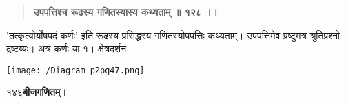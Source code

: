 \documentclass[11pt, openany]{book}
\begin{document}
\begin{sloppypar}
\begin{quote}
\hspace{1in}\textbf{उपपत्तिश्च रूढस्य गणितस्यास्य कथ्यताम् ॥ १२८ ।।}
\end{quote}

\hangindent=0.2in \hspace{0.2in}'तत्कृत्योर्योषपदं कर्णः' इति रूढस्य प्रसिद्धस्य गणितस्योपपत्तिः कथ्यताम्। उपपत्तिमेव प्रष्टुमत्र श्रुतिप्रश्नो द्रष्टव्यः। अत्र कर्णः या १। क्षेत्रदर्शनं

\begin{center}
    \texttt{[image: /Diagram\_p2pg47.png]}
\end{center}
\end{sloppypar}
\thispagestyle{empty}
\newpage

\onehalfspacing
१४६\hspace{2in}\textbf{बीजगणितम्।} 

\vspace{5mm}
\end{document}
